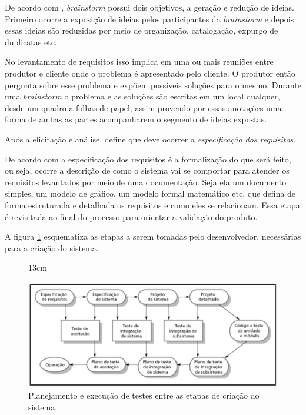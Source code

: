 De acordo com , \textit{brainstorm} possui dois objetivos, a geração e redução de ideias. Primeiro ocorre a exposição de ideias pelos participantes da \textit{brainstorm} e depois essas ideias são reduzidas por meio de organização, catalogação, expurgo de duplicatas etc.

No levantamento de requisitos isso implica em uma ou mais reuniões entre produtor e cliente onde o problema é apresentado pelo cliente. O produtor então pergunta sobre esse problema e expõem possíveis soluções para o mesmo. Durante uma \textit{brainstorm} o problema e as soluções são escritas em um local qualquer, desde um quadro a folhas de papel, assim provendo por essas anotações uma forma de ambas as partes acompanharem o segmento de ideias expostas.

Após a elicitação e análise,  define que deve ocorrer a \textit{especificação dos requisitos}.

De acordo com  a especificação dos requisitos é a formalização do que será feito, ou seja, ocorre a descrição de como o sistema vai se comportar para atender os requisitos levantados por meio de uma documentação. Seja ela um documento simples, um modelo de gráfico, um modelo formal matemático etc, que defina de forma estruturada e detalhada os requisitos e como eles se relacionam. Essa etapa é revisitada ao final do processo para orientar a validação do produto.

A figura \ref{faseteste} esquematiza as etapas a serem tomadas pelo desenvolvedor, necessárias para a criação do sistema.

\begin{figure}[!ht]{13cm}
  \caption{Planejamento e execução de testes entre as etapas de criação do sistema.} \label{faseteste}
  \includegraphics[width=1\hsize]{figuras/fases_de_teste.png}
\end{figure}

